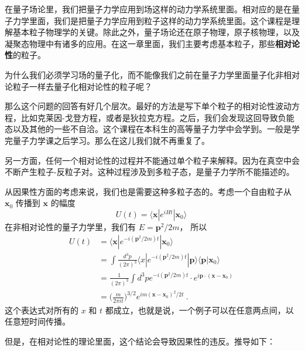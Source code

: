 

在量子场论里，我们把量子力学应用到场这样的动力学系统里面。相对应的是在量子力学里面，我们是把量子力学应用到粒子这样的动力学系统里面。这个课程是理解基本粒子物理学的关键。除此之外，量子场论还在原子物理，原子核物理，以及凝聚态物理中有诸多的应用。在这一章里面，我们主要考虑基本粒子，那些\textbf{相对论性}的粒子。

为什么我们必须学习场的量子化，而不能像我们之前在量子力学里面量子化非相对论粒子一样去量子化相对论性的粒子呢？

那么这个问题的回答有好几个层次。最好的方法是写下单个粒子的相对论性波动方程，比如克莱因-戈登方程，或者是狄拉克方程。之后，我们会发现这回导致负能态以及其他的一些不自洽。这个课程在本科生的高等量子力学中会学到。一般是学完量子力学课之后学习。那么在这儿我们就不再重复了。

另一方面，任何一个相对论性的过程并不能通过单个粒子来解释。因为在真空中会不断产生粒子-反粒子对。这种过程涉及到多粒子态，是量子力学所不能描述的。

从因果性方面的考虑来说，我们也是需要这种多粒子态的。考虑一个自由粒子从 $\mathbf x_0$ 传播到 $\mathbf x$ 的幅度
\begin{equation}
U(t) = \langle \mathbf x | e^{i H t} | \mathbf x_0 \rangle~
\end{equation}
在非相对论性的量子力学里，我们有 $E = \mathbf p^2/2m$， 所以
\begin{equation}\label{eq_qed2_2}
\begin{aligned}
U(t) & = \langle \mathbf x | e^{-i(\mathbf p^2/2m)t}|\mathbf x_0\rangle \\
& = \int \frac{d^3 p}{(2\pi)^3} \langle x | e^{-i(\mathbf p^2/2m)t} | \mathbf p \rangle \langle \mathbf p | \mathbf x_0 \rangle \\
& = \frac{1}{(2\pi)^3} \int d^3 p e^{- i (\mathbf p^2/2m)t}\cdot e^{i\mathbf p \cdot (\mathbf x - \mathbf x_0) } \\
& = \bigg( \frac{m}{2\pi it} \bigg)^{3/2} e^{im(\mathbf x - \mathbf x_0)^2/2t}~.
\end{aligned}~
\end{equation}
这个表达式对所有的 $x$ 和 $t$ 都成立，也就是说，一个例子可以在任意两点间，以任意短时间传播。

但是，在相对论性的理论里面，这个结论会导致因果性的违反。推导如下：

